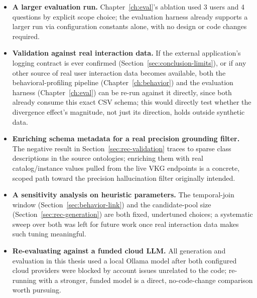 \documentclass[11pt,a4paper,oneside]{book}
\begin{document}
\begin{itemize}
    \item \textbf{A larger evaluation run.} Chapter~\ref{ch:eval}'s ablation used 3 users and 4
        questions by explicit scope choice; the evaluation harness already supports a larger run via
        configuration constants alone, with no design or code changes required.
    \item \textbf{Validation against real interaction data.} If the external application's logging
        contract is ever confirmed (Section~\ref{sec:conclusion-limits}), or if any other source of
        real user interaction data becomes available, both the behavioral-profiling pipeline
        (Chapter~\ref{ch:behavior}) and the evaluation harness (Chapter~\ref{ch:eval}) can be
        re-run against it directly, since both already consume this exact CSV schema; this would
        directly test whether the divergence effect's magnitude, not just its direction, holds
        outside synthetic data.
    \item \textbf{Enriching schema metadata for a real precision grounding filter.} The negative
        result in Section~\ref{sec:rec-validation} traces to sparse class descriptions in the source
        ontologies; enriching them with real catalog/instance values pulled from the live VKG
        endpoints is a concrete, scoped path toward the precision hallucination filter originally
        intended.
    \item \textbf{A sensitivity analysis on heuristic parameters.} The temporal-join window
        (Section~\ref{sec:behavior-link}) and the candidate-pool size
        (Section~\ref{sec:rec-generation}) are both fixed, undertuned choices; a systematic sweep
        over both was left for future work once real interaction data makes such tuning meaningful.
    \item \textbf{Re-evaluating against a funded cloud LLM.} All generation and evaluation in this
        thesis used a local Ollama model after both configured cloud providers were blocked by
        account issues unrelated to the code; re-running with a stronger, funded model is a direct,
        no-code-change comparison worth pursuing.
\end{itemize}

\backmatter
\end{document}
